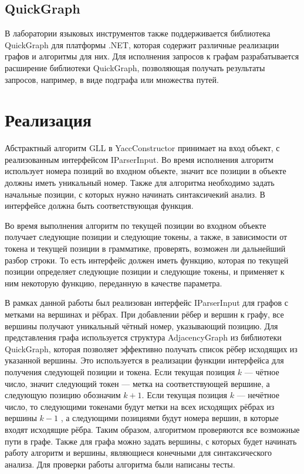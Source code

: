 \documentclass[14pt]{matmex-diploma}
\begin{document}
\subsection{QuickGraph}

В лаборатории языковых инструментов также поддерживается библиотека QuickGraph для платформы .NET, которая содержит различные реализации графов и алгоритмы для них. Для исполнения запросов к графам разрабатывается расширение библиотеки QuickGraph, позволяющая получать результаты запросов, например, в виде подграфа или множества путей.

\section{Реализация}
Абстрактный алгоритм GLL в YaccConstructor принимает на вход объект, с реализованным интерфейсом IParserInput. Во время исполнения алгоритм использует номера позиций во входном объекте, значит все позиции в объекте должны иметь уникальный номер. Также для алгоритма необходимо задать начальные позиции, с которых нужно начинать синтаксичекий анализ. В интерфейсе должна быть соответствующая функция.

Во время выполнения алгоритм по текущей позиции во входном объекте получает следующие позиции и следующие токены, а также, в зависимости от токена и текущей позиции в грамматике, проверять, возможен ли дальнейший разбор строки. То есть интерфейс должен иметь функцию, которая по текущей позиции определяет следующие позиции и следующие токены, и применяет к ним некоторую функцию, переданную в качестве параметра.

В рамках данной работы был реализован интерфейс IParserInput для графов с метками на вершинах и рёбрах. При добавлении рёбер и вершин к графу, все вершины получают уникальный чётный номер, указывающий позицию. Для представления графа используется структура AdjacencyGraph из библиотеки QuickGraph, которая позволяет эффективно получать список рёбер исходящих из указанной вершины. Это используется в реализации функции интерфейса для получения следующей позиции и токена. Если текущая позиция $k$ --- чётное число, значит следующий токен --- метка на соответствующей вершине, а следующую позицию обозначим $k+1$. Если текущая позиция  $k$ --- нечётное число, то следующими токенами будут метки на всех исходящих рёбрах из вершины $k-1$ , а следующими позициями будут номера вершин, в которые входят исходящие рёбра. Таким образом, алгоритмом проверяются все возможные пути в графе. Также для графа можно задать вершины, с которых будет начинать работу алгоритм и вершины, являющиеся конечными для синтаксического анализа. Для проверки работы алгоритма были написаны тесты.
\end{document}
